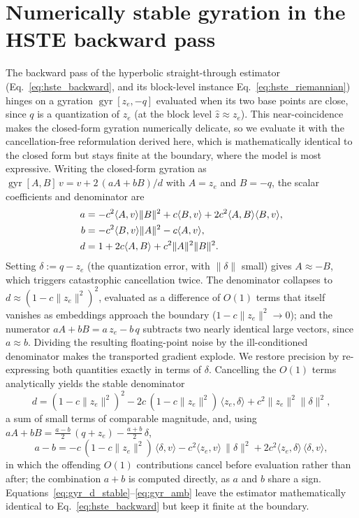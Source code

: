 \documentclass[12pt]{report}
\begin{document}
\section{Numerically stable gyration in the HSTE backward pass}
\label{app:gyration}
The backward pass of the hyperbolic straight-through estimator (Eq.~\ref{eq:hste_backward}, and its block-level instance Eq.~\ref{eq:hste_riemannian}) hinges on a gyration $\operatorname{gyr}[z_e,-q]$ evaluated when its two base points are close, since $q$ is a quantization of $z_e$ (at the block level $\hat z\approx z_e$). This near-coincidence makes the closed-form gyration numerically delicate, so we evaluate it with the cancellation-free reformulation derived here, which is mathematically identical to the closed form but stays finite at the boundary, where the model is most expressive. Writing the closed-form gyration as $\operatorname{gyr}[A,B]\,v = v + 2\,(aA+bB)/d$ with $A=z_e$ and $B=-q$, the scalar coefficients and denominator are
\begin{align}
    a &= -c^2\langle A,v\rangle\|B\|^2 + c\langle B,v\rangle + 2c^2\langle A,B\rangle\langle B,v\rangle,\notag\\
    b &= -c^2\langle B,v\rangle\|A\|^2 - c\langle A,v\rangle,\notag\\
    d &= 1 + 2c\langle A,B\rangle + c^2\|A\|^2\|B\|^2 .
\end{align}
Setting $\delta := q - z_e$ (the quantization error, with $\|\delta\|$ small) gives $A\approx -B$, which triggers catastrophic cancellation twice. The denominator collapses to $d\approx(1-c\|z_e\|^2)^2$, evaluated as a difference of $O(1)$ terms that itself vanishes as embeddings approach the boundary ($1-c\|z_e\|^2\to 0$); and the numerator $aA+bB = a\,z_e - b\,q$ subtracts two nearly identical large vectors, since $a\approx b$. Dividing the resulting floating-point noise by the ill-conditioned denominator makes the transported gradient explode. We restore precision by re-expressing both quantities exactly in terms of $\delta$. Cancelling the $O(1)$ terms analytically yields the stable denominator
\begin{equation}
    \label{eq:gyr_d_stable}
    d = (1-c\|z_e\|^2)^2 - 2c\,(1-c\|z_e\|^2)\,\langle z_e,\delta\rangle + c^2\|z_e\|^2\|\delta\|^2,
\end{equation}
a sum of small terms of comparable magnitude, and, using $aA+bB = \tfrac{a-b}{2}\,(q+z_e) - \tfrac{a+b}{2}\,\delta$,
\begin{equation}
    \label{eq:gyr_amb}
    a-b = -c\,(1-c\|z_e\|^2)\,\langle\delta,v\rangle - c^2\langle z_e,v\rangle\,\|\delta\|^2 + 2c^2\langle z_e,\delta\rangle\,\langle\delta,v\rangle ,
\end{equation}
in which the offending $O(1)$ contributions cancel before evaluation rather than after; the combination $a+b$ is computed directly, as $a$ and $b$ share a sign. Equations~\ref{eq:gyr_d_stable}--\ref{eq:gyr_amb} leave the estimator mathematically identical to Eq.~\ref{eq:hste_backward} but keep it finite at the boundary.



\end{document}
